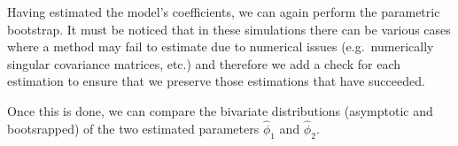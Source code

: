 \documentclass[]{book}
\newenvironment{Shaded}{\begin{snugshade}}{\end{snugshade}}
\newcommand{\KeywordTok}[1]{\textcolor[rgb]{0.13,0.29,0.53}{\textbf{#1}}}
\newcommand{\DataTypeTok}[1]{\textcolor[rgb]{0.13,0.29,0.53}{#1}}
\newcommand{\DecValTok}[1]{\textcolor[rgb]{0.00,0.00,0.81}{#1}}
\newcommand{\StringTok}[1]{\textcolor[rgb]{0.31,0.60,0.02}{#1}}
\newcommand{\CommentTok}[1]{\textcolor[rgb]{0.56,0.35,0.01}{\textit{#1}}}
\newcommand{\OtherTok}[1]{\textcolor[rgb]{0.56,0.35,0.01}{#1}}
\newcommand{\ControlFlowTok}[1]{\textcolor[rgb]{0.13,0.29,0.53}{\textbf{#1}}}
\newcommand{\OperatorTok}[1]{\textcolor[rgb]{0.81,0.36,0.00}{\textbf{#1}}}
\newcommand{\NormalTok}[1]{#1}
\theoremstyle{definition}
\theoremstyle{definition}
\theoremstyle{definition}
\theoremstyle{remark}
\begin{document}
Having estimated the model's coefficients, we can again perform the
parametric bootstrap. It must be noticed that in these simulations there
can be various cases where a method may fail to estimate due to
numerical issues (e.g.~numerically singular covariance matrices, etc.)
and therefore we add a check for each estimation to ensure that we
preserve those estimations that have succeeded.

\begin{Shaded}
\end{Shaded}

Once this is done, we can compare the bivariate distributions
(asymptotic and bootsrapped) of the two estimated parameters
\(\hat{\phi}_1\) and \(\hat{\phi}_2\).
\end{document}
